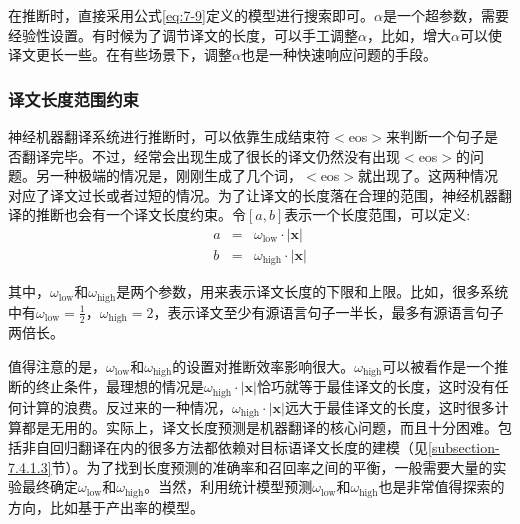 \parinterval 在推断时，直接采用公式\ref{eq:7-9}定义的模型进行搜索即可。$\alpha$是一个超参数，需要经验性设置。有时候为了调节译文的长度，可以手工调整$\alpha$，比如，增大$\alpha$可以使译文更长一些。在有些场景下，调整$\alpha$也是一种快速响应问题的手段。


\subsubsection{译文长度范围约束}

\parinterval 神经机器翻译系统进行推断时，可以依靠生成结束符$<$eos$>$来判断一个句子是否翻译完毕。不过，经常会出现生成了很长的译文仍然没有出现$<$eos$>$的问题。另一种极端的情况是，刚刚生成了几个词，$<$eos$>$就出现了。这两种情况对应了译文过长或者过短的情况。为了让译文的长度落在合理的范围，神经机器翻译的推断也会有一个译文长度约束。令$[a,b]$表示一个长度范围，可以定义:
\begin{eqnarray}
a &=& \omega_{\textrm{low}}\cdot |\mathbf{x}| \\
b &=& \omega_{\textrm{high}}\cdot |\mathbf{x}|
\label{eq:7-10}
\end{eqnarray}

\noindent 其中，$\omega_{\textrm{low}}$和$\omega_{\textrm{high}}$是两个参数，用来表示译文长度的下限和上限。比如，很多系统中有$\omega_{\textrm{low}}=\frac{1}{2}$，$\omega_{\textrm{high}}=2$，表示译文至少有源语言句子一半长，最多有源语言句子两倍长。

\parinterval 值得注意的是，$\omega_{\textrm{low}}$和$\omega_{\textrm{high}}$的设置对推断效率影响很大。$\omega_{\textrm{high}}$可以被看作是一个推断的终止条件，最理想的情况是$\omega_{\textrm{high}} \cdot |\mathbf{x}|$恰巧就等于最佳译文的长度，这时没有任何计算的浪费。反过来的一种情况，$\omega_{\textrm{high}} \cdot |\mathbf{x}|$远大于最佳译文的长度，这时很多计算都是无用的。实际上，译文长度预测是机器翻译的核心问题，而且十分困难。包括非自回归翻译在内的很多方法都依赖对目标语译文长度的建模（见\ref{subsection-7.4.1.3}节）。为了找到长度预测的准确率和召回率之间的平衡，一般需要大量的实验最终确定$\omega_{\textrm{low}}$和$\omega_{\textrm{high}}$。当然，利用统计模型预测$\omega_{\textrm{low}}$和$\omega_{\textrm{high}}$也是非常值得探索的方向，比如基于产出率的模型。



